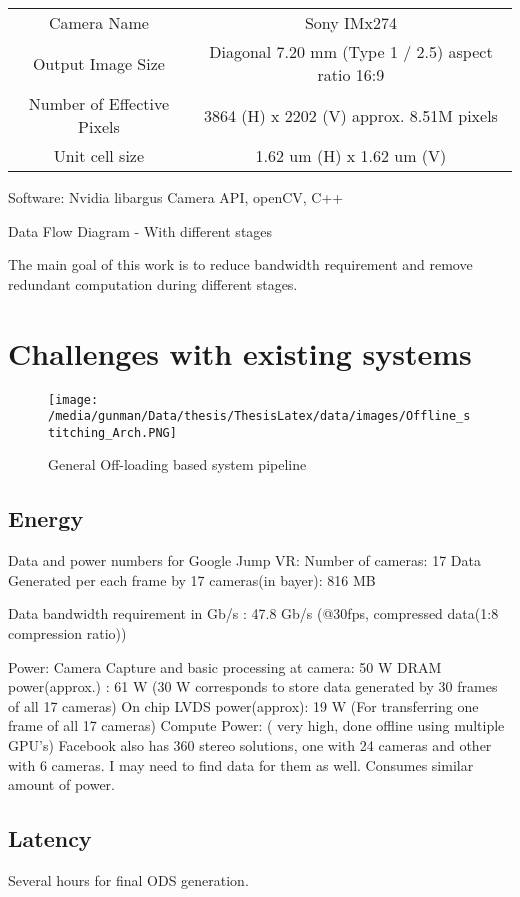 \begin{tabular}{c|c}
	Camera Name & Sony IMx274 \\
	Output Image Size & Diagonal 7.20 mm (Type 1 / 2.5) aspect ratio 16:9 \\
	Number of Effective Pixels & 3864 (H) x 2202 (V) approx. 8.51M pixels \\
	Unit cell size & 1.62 um (H) x 1.62 um (V) \\
\end{tabular} \newline

Software:
Nvidia libargus Camera API,
openCV, C++ \newline

Data Flow Diagram
- With different stages

The main goal of this work is to reduce bandwidth requirement and remove redundant computation during different stages. 



\section{Challenges with existing systems}

\begin{figure}[h]
	\begin{center}
		\texttt{[image: /media/gunman/Data/thesis/ThesisLatex/data/images/Offline\_stitching\_Arch.PNG]}
		\caption{General Off-loading based system pipeline}
		\label{fig:ex_4_9}
	\end{center}
	\vspace{-0.3in}
\end{figure} 

\subsection{Energy}
Data and power numbers for Google Jump VR:
Number of cameras: 17
Data Generated per each frame by 17 cameras(in bayer): 816 MB

Data bandwidth requirement in Gb/s : 47.8 Gb/s
(@30fps, compressed data(1:8 compression ratio))

Power:
Camera Capture and basic processing at camera:  50 W
DRAM power(approx.) : 61 W 
(30 W corresponds to store data generated by 30 frames of all 17 cameras)
On chip LVDS power(approx): 19 W
(For transferring one frame of all 17 cameras)
Compute Power: ( very high, done offline using multiple GPU's)
Facebook also has 360 stereo solutions, one with 24 cameras and other with 6 cameras. I may need to find data for them as well. Consumes similar amount of power.
\subsection{Latency}
Several hours for final ODS generation.
